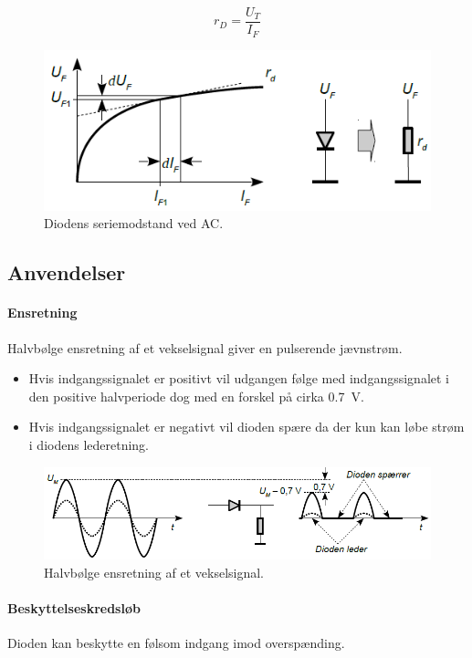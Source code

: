 \documentclass[danish]{article}
\begin{document}
\begin{equation}
r_D = \dfrac{U_T}{I_F}
\end{equation}

\begin{figure} [H]
	\centering
	\includegraphics[width=0.8\linewidth]{graphics/ACdiode}
	\caption{Diodens seriemodstand ved AC.}
	\label{fig:AC_diode}
\end{figure}

\subsection{Anvendelser}
\paragraph{Ensretning} Halvbølge ensretning af et vekselsignal giver en pulserende jævnstrøm.

\begin{itemize}
	\item Hvis indgangssignalet er positivt vil udgangen følge med indgangssignalet i den positive halvperiode dog med en forskel på cirka \SI{0,7}{\volt}.
	\item Hvis indgangssignalet er negativt vil dioden spære da der kun kan løbe strøm i diodens lederetning.
\end{itemize}

\begin{figure} [H]
	\centering
	\includegraphics[width=\linewidth]{graphics/ensretning}
	\caption{Halvbølge ensretning af et vekselsignal.}
	\label{fig:ensretning}
\end{figure}

\paragraph{Beskyttelseskredsløb} Dioden kan beskytte en følsom indgang imod overspænding.
\end{document}
